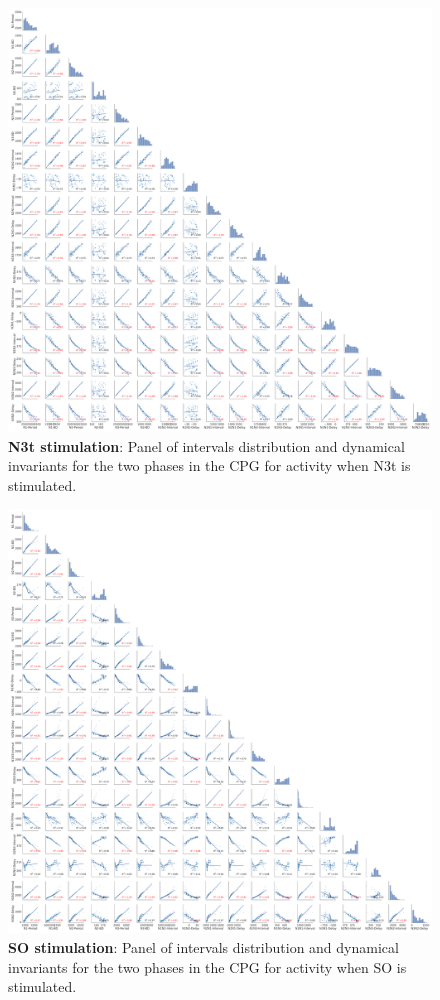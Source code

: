 \begin{figure}[htbp]
	\centering
	\includegraphics[width=\textwidth]{./invariants/data/MODEL/n3t_driven/images/3phases/output_pairplot.pdf}
	\caption{\textbf{N3t stimulation}: Panel of intervals distribution and dynamical invariants for the two phases in the CPG for activity when N3t is stimulated.}
	\label{fig:model n3t stimulation pairplot}
\end{figure}

\begin{figure}[htbp]
	\centering
	\includegraphics[width=\textwidth]{./invariants/data/MODEL/so_driven/images/3phases/output_pairplot.pdf}
	\caption{\textbf{SO stimulation}: Panel of intervals distribution and dynamical invariants for the two phases in the CPG for activity when SO is stimulated.}
	\label{fig:model so stimulation pairplot}
\end{figure}


